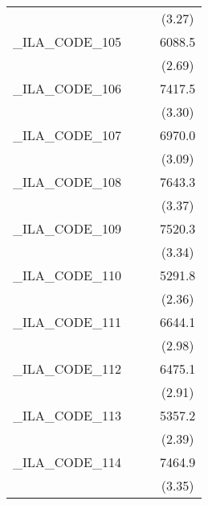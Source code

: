 {\begin{tabular}{l*{3}{c}}
            &                     &                     &      (3.27)         \\
[1em]
\_ILA\_CODE\_105&                     &                     &      6088.5\sym{**} \\
            &                     &                     &      (2.69)         \\
[1em]
\_ILA\_CODE\_106&                     &                     &      7417.5\sym{***}\\
            &                     &                     &      (3.30)         \\
[1em]
\_ILA\_CODE\_107&                     &                     &      6970.0\sym{**} \\
            &                     &                     &      (3.09)         \\
[1em]
\_ILA\_CODE\_108&                     &                     &      7643.3\sym{***}\\
            &                     &                     &      (3.37)         \\
[1em]
\_ILA\_CODE\_109&                     &                     &      7520.3\sym{***}\\
            &                     &                     &      (3.34)         \\
[1em]
\_ILA\_CODE\_110&                     &                     &      5291.8\sym{*}  \\
            &                     &                     &      (2.36)         \\
[1em]
\_ILA\_CODE\_111&                     &                     &      6644.1\sym{**} \\
            &                     &                     &      (2.98)         \\
[1em]
\_ILA\_CODE\_112&                     &                     &      6475.1\sym{**} \\
            &                     &                     &      (2.91)         \\
[1em]
\_ILA\_CODE\_113&                     &                     &      5357.2\sym{*}  \\
            &                     &                     &      (2.39)         \\
[1em]
\_ILA\_CODE\_114&                     &                     &      7464.9\sym{***}\\
            &                     &                     &      (3.35)         \\

\end{tabular}}
